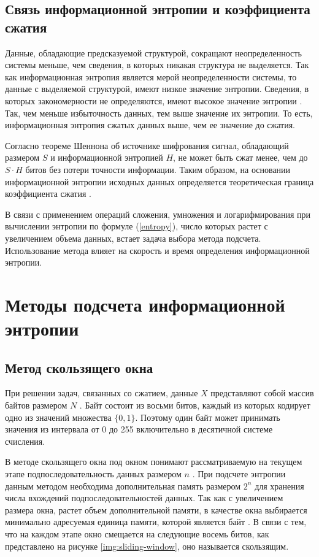 \subsection{Связь информационной энтропии и коэффициента сжатия}

Данные, обладающие предсказуемой структурой, сокращают неопределенность системы меньше, чем сведения, в которых никакая структура не выделяется. Так как информационная энтропия является мерой неопределенности системы, то данные с выделяемой структурой, имеют низкое значение энтропии. Сведения, в которых закономерности не определяются, имеют высокое значение энтропии \cite{relation}. Так, чем меньше избыточность данных, тем выше значение их энтропии. То есть, информационная энтропия сжатых данных выше, чем ее значение до сжатия.

Согласно теореме Шеннона об источнике шифрования сигнал, обладающий размером $S$ и информационной энтропией $H$, не может быть сжат менее, чем до $S \cdot H$ битов без потери точности информации. Таким образом, на основании информационной энтропии исходных данных определяется теоретическая граница коэффициента сжатия \cite{theorem}.

В связи с применением операций сложения, умножения и логарифмирования при вычислении энтропии по формуле (\ref{entropy}), число которых растет с увеличением объема данных, встает задача выбора метода подсчета. Использование метода влияет на скорость и время определения информационной энтропии.

\section{Методы подсчета информационной энтропии}

\subsection{Метод скользящего окна}

При решении задач, связанных со сжатием, данные $X$ представляют собой массив байтов размером $N$ \cite{bytes}. Байт состоит из восьми битов, каждый из которых кодирует одно из значений множества $\{0, 1\}$. Поэтому один байт может принимать значения из интервала от 0 до 255 включительно в десятичной системе счисления. 

В методе скользящего окна под окном понимают рассматриваемую на текущем этапе подпоследовательность данных размером $n$ \cite{sliding-window-method}. При подсчете энтропии данным методом необходима дополнительная память размером $2^n$ для хранения числа вхождений подпоследовательностей данных. Так как с увеличением размера окна, растет объем дополнительной памяти, в качестве окна выбирается минимально адресуемая единица памяти, которой является байт \cite{memory-unit}. В связи с тем, что на каждом этапе окно смещается на следующие восемь битов, как представлено на рисунке \ref{img:sliding-window}, оно называется скользящим.


